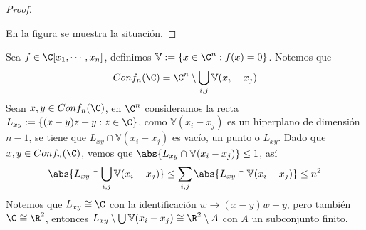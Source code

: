 \documentclass{article}
\begin{document}
\begin{proof}
\begin{center}
    \end{center}
    En la figura se muestra la situación.
\end{proof}

\noindent Sea $f\in\C[x_{1},\cdots,x_{n}]$, definimos $\mathbb{V}:=\{x\in\C^{n}:f(x)=0\}$. Notemos 
que
\begin{equation*}
    Conf_{n}(\C)=\C^{n}\setminus\bigcup_{i,j}\mathbb{V}(x_{i}-x_{j})
\end{equation*}
Sean $x,y\in Conf_{n}(\C)$, en $\C^{n}$ consideramos la recta $L_{xy}:=\{(x-y)z+y:z\in\C\}$, como
$\mathbb{V}(x_{i}-x_{j})$ es un hiperplano de dimensión $n-1$, se tiene que 
$L_{xy}\cap\mathbb{V}(x_{i}-x_{j})$ es vacío, un punto o $L_{xy}$. Dado que $x,y\in Conf_{n}(\C)$, 
vemos que $\abs{L_{xy}\cap\mathbb{V}(x_{i}-x_{j})}\leq1$, así
\begin{equation*}
    \abs{L_{xy}\cap\bigcup_{i,j}\mathbb{V}(x_{i}-x_{j})}\leq\sum_{i,j}\abs{L_{xy}
    \cap\mathbb{V}(x_{i}-x_{j})}\leq n^{2}
\end{equation*}
Notemos que $L_{xy}\cong\C$ con la identificación $w\to(x-y)w+y$, pero también $\C\cong\R^{2}$, 
entonces $L_{xy}\setminus\bigcup\mathbb{V}(x_{i}-x_{j})\cong\R^{2}\setminus A$ con $A$ un 
subconjunto finito.

\newpage
\end{document}
